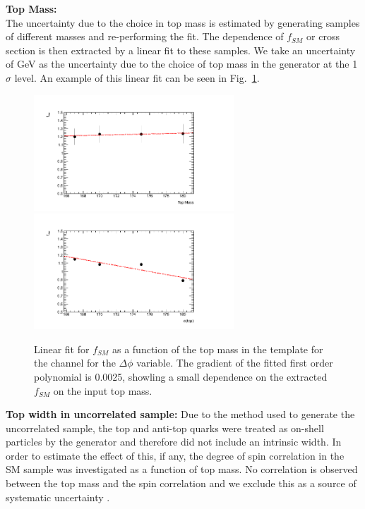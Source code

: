 \vspace{5mm}
\noindent
\textbf{Top Mass:}\\
The uncertainty due to the choice in top mass is estimated by generating samples of different masses and re-performing the fit. The dependence of $f_{SM}$ or cross section is then extracted by a linear fit to these samples. We take an uncertainty of  GeV as the uncertainty due to the choice of top mass in the generator at the 1 $\sigma$ level. An example of this linear fit can be seen in Fig.~\ref{fig:top_mass}.

\begin{figure}[hbtp]
	\begin{center}
	\includegraphics[width = 75mm]{f/delta_phi10_emu_TopMassTest}
	\includegraphics[width = 75mm]{f/delta_phi10_emu_TopMass_XsecTest}
	\end{center}
       \caption{Linear fit for $f_{SM}$ as a function of the top mass in the template for the \emu channel for the $\Delta\phi$ variable. The gradient of the fitted first order polynomial is 0.0025, showling a small dependence on the extracted $f_{SM}$ on the input top mass.}	
        \label{fig:top_mass}
\end{figure}

\vspace{5mm}
\noindent
\textbf{Top width in uncorrelated sample:}\newline
Due to the method used to generate the uncorrelated sample, the top and anti-top quarks were treated as on-shell particles by the generator and therefore did not include an intrinsic width. In order to estimate the effect of this, if any, the degree of spin correlation in the SM sample was investigated as a function of top mass. No correlation is observed between the top mass and the spin correlation and we exclude this as a source of systematic uncertainty .

